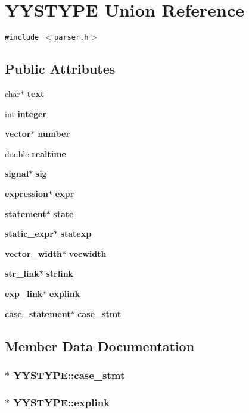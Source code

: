 \section{YYSTYPE  Union Reference}
\label{unionYYSTYPE}
{\tt \#include $<$parser.h$>$}

\subsection*{Public Attributes}
\begin{CompactItemize}
\item 
char$\ast$ {\bf text}
\item 
int {\bf integer}
\item 
{\bf vector}$\ast$ {\bf number}
\item 
double {\bf realtime}
\item 
{\bf signal}$\ast$ {\bf sig}
\item 
{\bf expression}$\ast$ {\bf expr}
\item 
{\bf statement}$\ast$ {\bf state}
\item 
{\bf static\_\-expr}$\ast$ {\bf statexp}
\item 
{\bf vector\_\-width}$\ast$ {\bf vecwidth}
\item 
{\bf str\_\-link}$\ast$ {\bf strlink}
\item 
{\bf exp\_\-link}$\ast$ {\bf explink}
\item 
{\bf case\_\-statement}$\ast$ {\bf case\_\-stmt}
\end{CompactItemize}


\subsection{Member Data Documentation}
\subsubsection{ $\ast$ YYSTYPE::case\_\-stmt}\label{unionYYSTYPE_m11}


\subsubsection{ $\ast$ YYSTYPE::explink}\label{unionYYSTYPE_m10}


